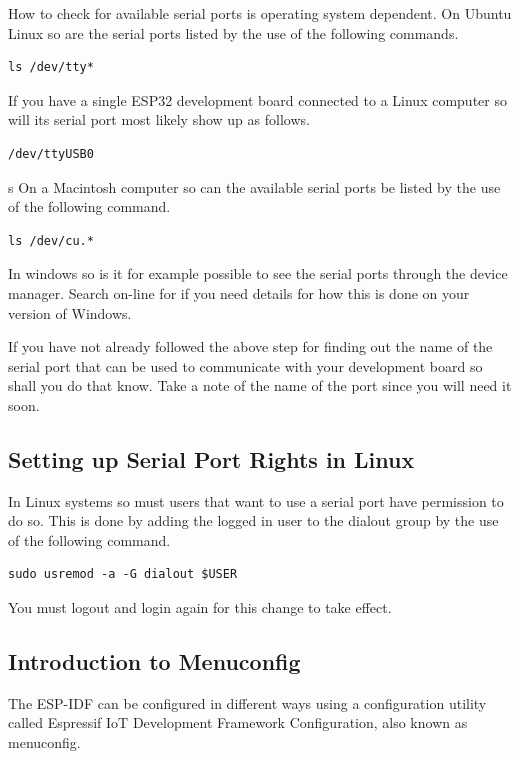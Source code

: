 \documentclass{tufte-book}
\begin{document}
How to check for available serial ports is operating system dependent. On Ubuntu Linux so are the serial ports listed by the use of the following commands.

\begin{lstlisting}
ls /dev/tty*
\end{lstlisting}

If you have a single ESP32 development board connected to a Linux computer so will its serial port most likely show up as follows.

\begin{lstlisting}
/dev/ttyUSB0
\end{lstlisting}
s
On a Macintosh computer so can the available serial ports be listed by the use of the following command.

\begin{lstlisting}
ls /dev/cu.*
\end{lstlisting}

In windows so is it for example possible to see the serial ports through the device manager. Search on-line for  if you need details for how this is done on your version of Windows.

If you have not already followed the above step for finding out the name of the serial port that can be used to communicate with your development board so shall you do that know. Take a note of the name of the port since you will need it soon.

\subsection{Setting up Serial Port Rights in Linux}
In Linux systems so must users that want to use a serial port have permission to do so. This is done by adding the logged in user to the dialout group by the use of the following command.

\begin{lstlisting}
sudo usremod -a -G dialout $USER
\end{lstlisting}

You must logout and login again for this change to take effect.

\subsection{Introduction to Menuconfig}
The ESP-IDF can be configured in different ways using a configuration utility called Espressif IoT Development Framework Configuration, also known as menuconfig.
\end{document}
